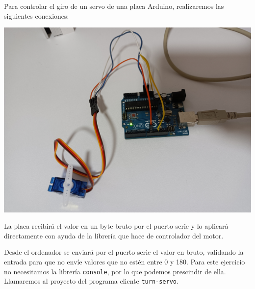 Para controlar el giro de un servo de una placa Arduino, realizaremos las
siguientes conexiones:

\includegraphics[width=\linewidth]{turn-servo-wiring.jpg}

La placa recibirá el valor en un byte bruto por el puerto serie y lo aplicará
directamente con ayuda de la librería que hace de controlador del motor.



Desde el ordenador se enviará por el puerto serie el valor en bruto,
validando la entrada para que no envíe valores que no estén entre 0 y 180.
Para este ejercicio no necesitamos la librería \verb|console|, por lo que
podemos prescindir de ella. Llamaremos al proyecto del programa cliente
\verb|turn-servo|.



